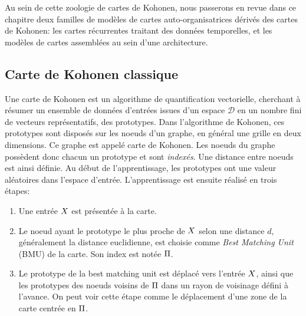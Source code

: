 Au sein de cette zoologie de cartes de Kohonen, nous passerons en revue dans ce chapitre deux familles de modèles de cartes auto-organisatrices dérivés des cartes de Kohonen: les cartes récurrentes traitant des données temporelles, et les modèles de cartes assemblées au sein d'une architecture.
\subsection{Carte de Kohonen classique}

Une carte de Kohonen est un algorithme de quantification vectorielle, cherchant à résumer un ensemble de données d'entrées issues d'un espace $\mathcal{D}$ en un nombre fini de vecteurs représentatifs, des prototypes.  Dans l'algorithme de Kohonen, ces prototypes sont disposés sur les noeuds d'un graphe, en général une grille en deux dimensions. Ce graphe est appelé carte de Kohonen. Les noeuds du graphe possèdent donc chacun un prototype et sont \emph{indexés}. Une distance entre noeuds est ainsi définie.
Au début de l'apprentissage, les prototypes ont une valeur aléatoires dans l'espace d'entrée. L'apprentissage est ensuite réalisé en trois étapes:
\begin{enumerate}
\item Une entrée $X$ est présentée à la carte.
\item Le noeud ayant le prototype le plus proche de $X$ selon une distance $d$, généralement la distance euclidienne, est choisie comme \emph{Best Matching Unit} (BMU) de la carte. Son index est notée $\Pi$.
\item Le prototype de la best matching unit est déplacé vers l'entrée $X$, ainsi que les prototypes des noeuds voisins de $\Pi$ dans un rayon de voisinage défini à l'avance. On peut voir cette étape comme le déplacement d'une zone de la carte centrée en $\Pi$.
\end{enumerate}

